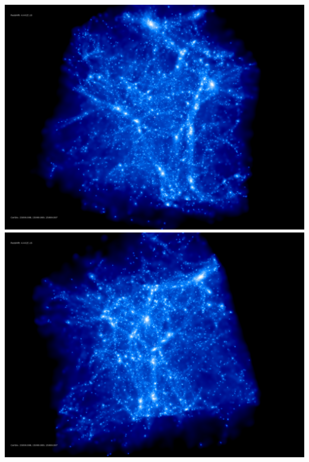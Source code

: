 \includegraphics[scale=0.1]{NGenIC_26214/rotate_00074.jpg} 
\includegraphics[scale=0.1]{NGenIC_26214/rotate_00131.jpg}

